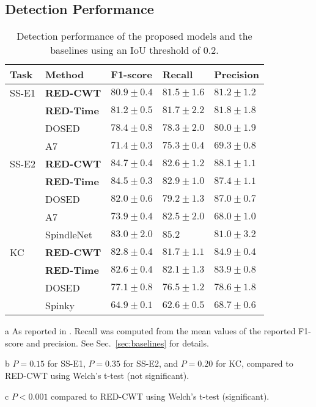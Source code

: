 \documentclass[conference]{IEEEtran}
\begin{document}
\subsection{Detection Performance}
\label{sec:result_performance}

\begin{table}[tbp]
\centering
\begin{threeparttable}
\caption{Detection performance of the proposed models and the baselines using an IoU threshold of 0.2.}
\label{tab:performance}
\begin{tabular}{lllll}
    \toprule
    Task & Method & F1-score & Recall & Precision \\
    \midrule
    SS-E1 & \textbf{RED-CWT} &
    $80.9\pm0.4$ & $81.5\pm1.6$ & $81.2\pm1.2$\\
    & \textbf{RED-Time} &
    $81.2\pm0.5$ \tnote{b} & $81.7\pm2.2$ & $81.8\pm1.8$\\
    & DOSED \cite{chambon2019dosed} &
    $78.4\pm0.8$ \tnote{c} & $78.3\pm2.0$ & $80.0\pm1.9$ \\
    & A7 \cite{lacourse2019sleep} &
    $71.4\pm0.3$ \tnote{c} & $75.3\pm0.4$ & $69.3\pm0.8$ \\
    \midrule
    SS-E2 & \textbf{RED-CWT} &
    $84.7\pm0.4$ & $82.6\pm1.2$ & $88.1\pm1.1$\\
    & \textbf{RED-Time} &
    $84.5\pm0.3$ \tnote{b} & $82.9\pm1.0$ & $87.4\pm1.1$\\
    & DOSED \cite{chambon2019dosed} &
    $82.0\pm0.6$ \tnote{c} & $79.2\pm1.3$ & $87.0\pm0.7$\\
    & A7 \cite{lacourse2019sleep} &
    $73.9\pm0.4$ \tnote{c} & $82.5\pm2.0$ & $68.0\pm1.0$\\
    & SpindleNet \cite{kulkarni2019deep} \tnote{a} &
    $83.0\pm 2.0$& $85.2$\hspace{21pt} & $81.0\pm 3.2$ \\
    \midrule
    KC & \textbf{RED-CWT} &
    $82.8\pm0.4$ & $81.7\pm1.1$ & $84.9\pm0.4$\\
    & \textbf{RED-Time} &
    $82.6\pm0.4$ \tnote{b} & $82.1\pm1.3$ & $83.9\pm0.8$\\
    & DOSED \cite{chambon2019dosed} &
    $77.1\pm0.8$ \tnote{c} & $76.5\pm1.2$ & $78.6\pm1.8$\\
    & Spinky \cite{lajnef2017meet} &
    $64.9\pm0.1$ \tnote{c} & $62.6\pm0.5$ & $68.7\pm0.6$\\
    \bottomrule
\end{tabular}
 \begin{tablenotes}
\footnotesize
\item[a]{As reported in \cite{kulkarni2019deep}. Recall was computed from the mean values of the reported F1-score and precision. See Sec.~\ref{sec:baselines} for details.}
\item[b]{$P=0.15$ for SS-E1, $P=0.35$ for SS-E2, and $P=0.20$ for KC, compared to RED-CWT using Welch's t-test (not significant).}
\item[c]{$P<0.001$ compared to RED-CWT using Welch's t-test (significant).}
\end{tablenotes}
\end{threeparttable}
\end{table}
\end{document}
